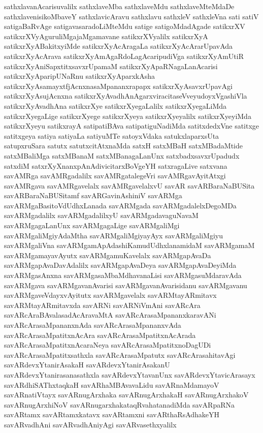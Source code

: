 {sathxlavanAcarisuvalilx
sathxlaveMba
sathxlaveMdu
sathxlaveMteMdaDe
sathxlavenisikoMbaveY
sathxlavicAravu
sathxlavu
sathxleV
sathxleVna
sati
satiV
satigaBaRvAge
satigavasaradoLiMteMdu
satige
satigoMdadAgade
satikxrXV
satikxrXVyAguruliMgajaMgamavane
satikxrXVyalilx
satikxrXyA
satikxrXyABakitxyiMde
satikxrXyAcAragaLa
satikxrXyAcArarUpavAda
satikxrXyAcArava
satikxrXyAmAgaRdoLagAcaripudiVga
satikxrXyAmUtiR
satikxrXyAniSapxtitxsavxrUpamaM
satikxrXyApaRNagaLanAcarisi
satikxrXyAparipUNaRnu
satikxrXyAparxkAsha
satikxrXyAsamayxtfjAcnxnasaMpananxrapapx
satikxrXyAsavxrUpavAgi
satikxrXyAsujAcnxna
satikxrXyAvadhAnAgarxviracitaseVveyudoyxVgashiVla
satikxrXyAvadhAna
satikxrXye
satikxrXyegaLalilx
satikxrXyegaLiMda
satikxrXyegaLige
satikxrXyege
satikxrXyeya
satikxrXyeyalilx
satikxrXyeyiMda
satikxrXyeyu
satikxrayA
satipatiBAva
satipatiguNadiMda
satitxdedxVne
satitxge
satitxgeya
satiya
satiyaLa
satiyuMTe
satoyxVdaka
satukxlaparxsUta
satupxruSara
satutx
satutxcitAtxnaMda
satxH
satxMBaH
satxMBadaMtide
satxMBaliMga
satxMBanaM
satxMBanagaLanUnx
satxbadxsavxrUpadudx
satxdiM
satxrXyXnanxpAnAdivicitarxBoVgeYH
satxragaLive
satxvana
savAMRga
savAMRgadalilx
savAMRgatalegeVri
savAMRgavAyitAtxgi
savAMRgava
savAMRgavelalx
savAMRgavelalxvU
savAR
savARBaraNaBUSita
savARBaraNaBUSitamf
savARGavinAshiniV
savARMga
savARMgaBasitoVdUdhxLanada
savARMgada
savARMgadalelxDegoMDa
savARMgadalilx
savARMgadalilxyU
savARMgadavaguNavaM
savARMgagaLanUnx
savARMgagaLige
savARMgaliMgi
savARMgaliMgiyAdaMtha
savARMgaliMgiyayAyx
savARMgaliMgiyu
savARMgaliVna
savARMgamApAdashiKamudUdhxlanamidaM
savARMgamaM
savARMgamayavAyutx
savARMgamuKavelalx
savARMgapAvaDa
savARMgapAvaDavAdalilx
savARMgapAvaDeya
savARMgapAvaDeyiMda
savARMgasAnxna
savARMgasaMbaMdhavanaLisi
savARMgasuMdaravAda
savARMgava
savARMgavanAvarisi
savARMgavanAvarisidanu
savARMgavanu
savARMgaveVdayxvAyitutx
savARMgavelalx
savARMtayARmitavx
savARMtayARmitavxda
savARNi
savARNiVmAni
savARcAra
savARcAraBAvalasadAcAravaMtA
savARcArasaMpananxkaravANi
savARcArasaMpananxnAda
savARcArasaMpananxvAda
savARcArasaMpatitxnAcAra
savARcArasaMpatitxnAcArada
savARcArasaMpatitxnAcaraNeya
savARcArasaMpatitxnoDagUDi
savARcArasaMpatitxsathxla
savARcArasaMpatutx
savARcArasahitavAgi
savARdevxYtanirAsakaH
savARdevxYtanirAsakanU
savARdevxYtanirasanasathxla
savARdevxYtavanUnx
savARdevxYtavicArasayx
savARdhiSAThxtaqkaH
savARhaMBAvavaLidu
savARnaMdamayoV
savARnatiVtayx
savARnugArxhaka
savARnugArxhakaH
savARnugArxhakoV
savARnugArxhiNoV
savARnugarxhakataqRvahatanadiMda
savARpaRNa
savARtamx
savARtamxkatavx
savARtamxni
savARthaRsAdhakeYH
savARvadhAni
savARvadhAniyAgi
savARvasethxyalilx
}
